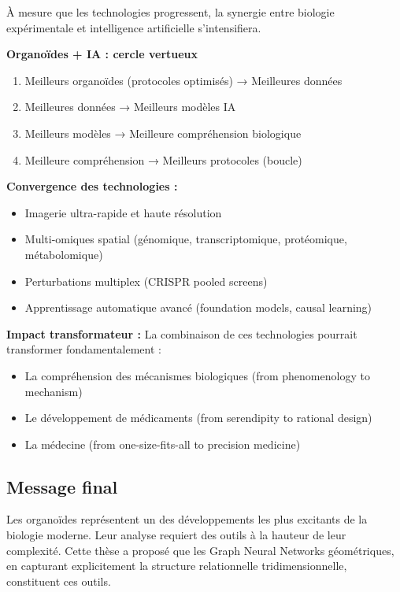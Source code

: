 À mesure que les technologies progressent, la synergie entre biologie expérimentale et intelligence artificielle s'intensifiera.

\textbf{Organoïdes + IA : cercle vertueux}
\begin{enumerate}
    \item Meilleurs organoïdes (protocoles optimisés) → Meilleures données
    \item Meilleures données → Meilleurs modèles IA
    \item Meilleurs modèles → Meilleure compréhension biologique
    \item Meilleure compréhension → Meilleurs protocoles (boucle)
\end{enumerate}

\textbf{Convergence des technologies :}
\begin{itemize}
    \item Imagerie ultra-rapide et haute résolution
    \item Multi-omiques spatial (génomique, transcriptomique, protéomique, métabolomique)
    \item Perturbations multiplex (CRISPR pooled screens)
    \item Apprentissage automatique avancé (foundation models, causal learning)
\end{itemize}

\textbf{Impact transformateur :}
La combinaison de ces technologies pourrait transformer fondamentalement :
\begin{itemize}
    \item La compréhension des mécanismes biologiques (from phenomenology to mechanism)
    \item Le développement de médicaments (from serendipity to rational design)
    \item La médecine (from one-size-fits-all to precision medicine)
\end{itemize}

\subsection{Message final}

Les organoïdes représentent un des développements les plus excitants de la biologie moderne. Leur analyse requiert des outils à la hauteur de leur complexité. Cette thèse a proposé que les Graph Neural Networks géométriques, en capturant explicitement la structure relationnelle tridimensionnelle, constituent ces outils.

